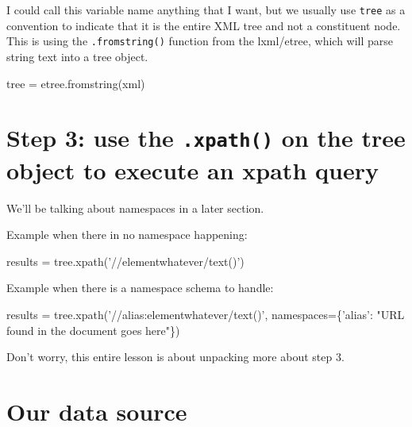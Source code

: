 \documentclass[11pt]{article}
\newenvironment{Shaded}{}{}
\newcommand{\StringTok}[1]{\textcolor[rgb]{0.25,0.44,0.63}{{#1}}}
\newcommand{\NormalTok}[1]{{#1}}
\newcommand{\OperatorTok}[1]{\textcolor[rgb]{0.40,0.40,0.40}{{#1}}}
\begin{document}
I could call this variable name anything that I want, but we usually use
\texttt{tree} as a convention to indicate that it is the entire XML tree
and not a constituent node. This is using the \texttt{.fromstring()}
function from the lxml/etree, which will parse string text into a tree
object.

\begin{Shaded}
\begin{Highlighting}[]
\NormalTok{tree }\OperatorTok{=}\NormalTok{ etree.fromstring(xml)}
\end{Highlighting}
\end{Shaded}

\section{\texorpdfstring{Step 3: use the \texttt{.xpath()} on the tree
object to execute an xpath
query}{Step 3: use the .xpath() on the tree object to execute an xpath query}}\label{step-3-use-the-.xpath-on-the-tree-object-to-execute-an-xpath-query}

We'll be talking about namespaces in a later section.

Example when there in no namespace happening:

\begin{Shaded}
\begin{Highlighting}[]
\NormalTok{results }\OperatorTok{=}\NormalTok{ tree.xpath(}\StringTok{'//elementwhatever/text()'}\NormalTok{)}
\end{Highlighting}
\end{Shaded}

Example when there is a namespace schema to handle:

\begin{Shaded}
\begin{Highlighting}[]
\NormalTok{results }\OperatorTok{=}\NormalTok{ tree.xpath(}\StringTok{'//alias:elementwhatever/text()'}\NormalTok{, namespaces}\OperatorTok{=}\NormalTok{\{}\StringTok{'alias'}\NormalTok{: }\StringTok{"URL found in the document goes here"}\NormalTok{\})}
\end{Highlighting}
\end{Shaded}

Don't worry, this entire lesson is about unpacking more about step 3.

\section{Our data source}\label{our-data-source}
\end{document}
